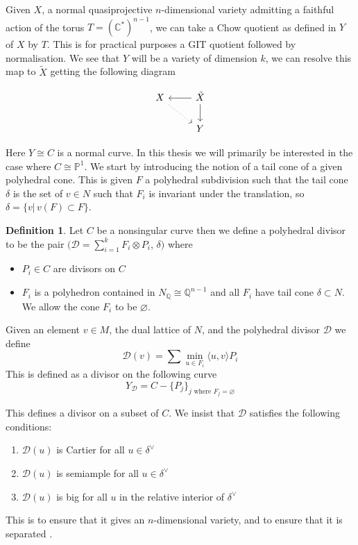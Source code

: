\documentclass[12pt,a4paper]{book}      %
\theoremstyle{definition}
\newtheorem{dfn}[thm]{Definition}
\begin{document}
Given $X$, a normal quasiprojective $n$-dimensional variety admitting a faithful action of the torus $ T = (\mathbb{C}^*)^{n-1}$, we can take a Chow quotient as defined in \cite{AltHau} $Y$ of $X$ by $T$. This is for practical purposes a GIT quotient followed by normalisation.  We see that $Y$ will be a variety of dimension $k$, we can resolve this map to $\tilde{X}$ getting the following diagram

\[
\begin{tikzcd}
X \arrow[rd, dotted] & \tilde{X} \arrow[l] \arrow[d]\\
& Y
\end{tikzcd}
\]

Here $Y \cong C$ is a normal curve. In this thesis we will primarily be interested in the case where $C \cong \mathbb{P}^1$. We start by introducing the notion of a tail cone of a given polyhedral cone. This is given $F$ a polyhedral subdivision such that the tail cone $\delta$ is the set of $v \in N$ such that $F_i$ is invariant under the translation, so $\delta = \{ v |\, v(F) \subset F \}$.
\begin{dfn}
Let $C$ be a nonsingular curve then we define a polyhedral divisor to be the pair $(\mathcal{D} = \sum_{i = 1}^k F_i \otimes P_i$, $\delta)$ where
\begin{itemize}
\item $P_i \in C$ are divisors on $C$ 
\item $F_i$ is a polyhedron contained in $N_\mathbb{Q} \cong \mathbb{Q}^{n-1}$ and all $F_i$ have tail cone $\delta \subset N$.  We allow the cone $F_i$ to be $\varnothing$.
\end{itemize}
Given an element $v \in M$, the dual lattice of $N$, and the polyhedral divisor $\mathcal{D}$ we define
\[
\mathcal{D}(v) = \sum \min_{u \in F_i} \langle u, v \rangle P_i
\]
This is defined as a divisor on the following curve
\[
Y_\mathcal{D} = C - \{P_j\}_{j \text{ where } F_j = \varnothing}
\]
\end{dfn}

This defines a divisor on a subset of $C$. We insist that $\mathcal{D}$ satisfies the following conditions:
\begin{enumerate} 
\item $\mathcal{D}(u)$ is Cartier for all $u \in \delta^\vee $
\item $\mathcal{D}(u)$ is semiample for all $u \in \delta^\vee$
\item $\mathcal{D}(u)$ is big for all $u$ in the relative interior of $\delta^\vee$
\end{enumerate}
This is to ensure that it gives an $n$-dimensional variety, and to ensure that it is separated \cite{PS}.
\end{document}
